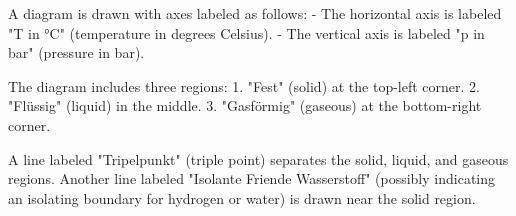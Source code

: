A diagram is drawn with axes labeled as follows:  
- The horizontal axis is labeled "T in °C" (temperature in degrees Celsius).  
- The vertical axis is labeled "p in bar" (pressure in bar).  

The diagram includes three regions:  
1. "Fest" (solid) at the top-left corner.  
2. "Flüssig" (liquid) in the middle.  
3. "Gasförmig" (gaseous) at the bottom-right corner.  

A line labeled "Tripelpunkt" (triple point) separates the solid, liquid, and gaseous regions.  
Another line labeled "Isolante Friende Wasserstoff" (possibly indicating an isolating boundary for hydrogen or water) is drawn near the solid region.